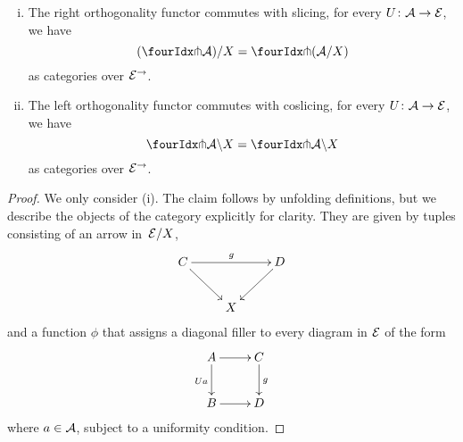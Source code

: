 \documentclass[reqno,10pt,a4paper,oneside]{amsart}
\begin{document}
\begin{lemma} \hfill 
\label{pitchfork-slicing}
\begin{enumerate}[(i)]
\item The right orthogonality functor commutes with slicing, \ie for every $U \co \cal{A} \to \cal{E}$, we have
\[
  (\liftr{\cal{A}})/X = \liftr{(\cal{A}/X)}
\]
as categories over $\cal{E}^\to$.
\item The left orthogonality functor commutes with coslicing, \ie for every $U \co \cal{A} \to \cal{E}$, we have
\[
 \liftl{\cal{A}} \backslash X = \liftl{\cal{A} \backslash X}
\]
as categories over $\cal{E}^\to$.
\end{enumerate}
\end{lemma}

\begin{proof} We only consider (i). The claim follows by unfolding definitions, but we describe the objects of the category explicitly for clarity. They are given by 
tuples consisting of an arrow in~$\cal{E}/X$, 
\[
\xymatrix{
C \ar[dr] \ar[rr]^g  &  & D \ar[dl] \\
 & X & }
 \]
and a function $\phi$ that assigns a diagonal filler to every diagram in $\cal{E}$ of the form
\[
\xymatrix{
A \ar[r] \ar[d]_{Ua} & C \ar[d]^g \\
B \ar[r] & D}
\]
where $a \in \cal{A}$, subject to a uniformity condition. 
\end{proof}

\medskip
\end{document}
